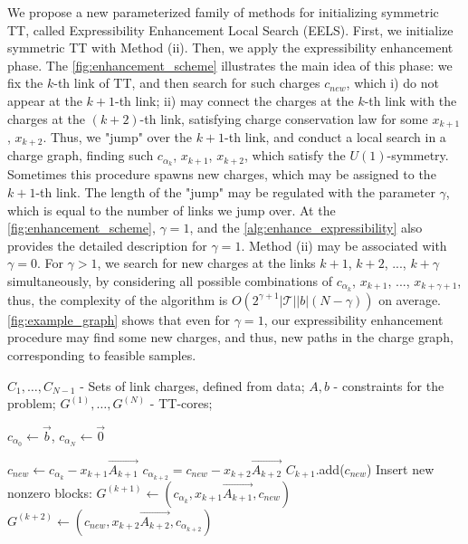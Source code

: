 \documentclass{article}
\theoremstyle{plain}
\theoremstyle{definition}
\theoremstyle{remark}
\begin{document}
We propose a new parameterized family of methods for initializing symmetric TT, called Expressibility Enhancement Local Search (EELS). First, we initialize symmetric TT with Method (ii). Then, we apply the expressibility enhancement phase. The \cref{fig:enhancement_scheme} illustrates the main idea of this phase: we fix the $k$-th link of TT, and then search for such charges $c_{new}$, which i) do not appear at the $k+1$-th link; ii) may connect the charges at the $k$-th link with the charges at the $(k+2)$-th link, satisfying charge conservation law for some $x_{k+1}$, $x_{k+2}$. Thus, we "jump" over the $k+1$-th link, and conduct a local search in a charge graph, finding such $c_{\alpha_{k}}$, $x_{k+1}$, $x_{k+2}$, which satisfy the $U(1)$-symmetry. Sometimes this procedure spawns new charges, which may be assigned to the $k+1$-th link. The length of the "jump" may be regulated with the parameter $\gamma$, which is equal to the number of links we jump over. At the \cref{fig:enhancement_scheme}, $\gamma=1$, and the \cref{alg:enhance_expressibility} also provides the detailed description for $\gamma=1$. Method (ii) may be associated with $\gamma=0$. For $\gamma>1$, we search for new charges at the links $k+1$, $k+2$, ..., $k+\gamma$ simultaneously, by considering all possible combinations of $c_{\alpha_k}$, $x_{k+1}$, ..., $x_{k+\gamma + 1}$, thus, the complexity of the algorithm is $O\left(2^{\gamma + 1}|\mathcal{T}| |b|(N-\gamma)\right)$ on average. \cref{fig:example_graph} shows that even for $\gamma=1$, our expressibility enhancement procedure may find some new charges, and thus, new paths in the charge graph, corresponding to feasible samples.


\begin{algorithm}
\caption{EELS algotithm, $\gamma=1$}
\label{alg:enhance_expressibility}
\begin{algorithmic}[1]

\REQUIRE $C_1,\dots, C_{N-1}$  - Sets of link charges, defined from data; $A, b$ - constraints for the problem; $G^{(1)}, \dots ,G^{(N)}$ - TT-cores;

\STATE $c_{\alpha_0}\gets \vec{b}$, $c_{\alpha_N} \gets \vec{0}$

            \STATE $c_{new} \gets c_{\alpha_k} - x_{k+1}\vec{A_{k+1}}$
                    \STATE $c_{\alpha_{k+2}} = c_{new} - x_{k+2}\vec{A_{k+2}}$
                    \STATE $C_{k+1}$.add($c_{new}$)
                    \STATE Insert new nonzero blocks:
                    \STATE $G^{(k+1)}\gets (c_{\alpha_{k}}, x_{k+1}\vec{A_{k+1}}, c_{new})$
                    \STATE $G^{(k+2)}\gets (c_{new}, x_{k+2}\vec{A_{k+2}},c_{\alpha_{k+2}})$
                \ENDIF
            \ENDFOR
        \ENDFOR
    \ENDFOR
\ENDFOR
\end{algorithmic}
\end{algorithm}
\end{document}
